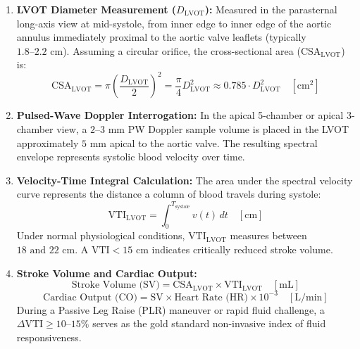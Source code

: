 \documentclass[11pt,a4paper]{article}
\begin{document}
\begin{enumerate}[leftmargin=1.5em]
    \item \textbf{LVOT Diameter Measurement ($D_{\text{LVOT}}$):} Measured in the parasternal long-axis view at mid-systole, from inner edge to inner edge of the aortic annulus immediately proximal to the aortic valve leaflets (typically $1.8\text{--}2.2\text{ cm}$). Assuming a circular orifice, the cross-sectional area ($\text{CS}\text{A}_{\text{LVOT}}$) is:
    \begin{equation}
        \text{CS}\text{A}_{\text{LVOT}} = \pi \left( \frac{D_{\text{LVOT}}}{2} \right)^2 = \frac{\pi}{4} D_{\text{LVOT}}^2 \approx 0.785 \cdot D_{\text{LVOT}}^2 \quad [\text{cm}^2]
    \end{equation}
    \item \textbf{Pulsed-Wave Doppler Interrogation:} In the apical 5-chamber or apical 3-chamber view, a $2\text{--}3\text{ mm}$ PW Doppler sample volume is placed in the LVOT approximately $5\text{ mm}$ apical to the aortic valve. The resulting spectral envelope represents systolic blood velocity over time.
    \item \textbf{Velocity-Time Integral Calculation:} The area under the spectral velocity curve represents the distance a column of blood travels during systole:
    \begin{equation}
        \text{VTI}_{\text{LVOT}} = \int_0^{T_{\text{systole}}} v(t) \, dt \quad [\text{cm}]
    \end{equation}
    Under normal physiological conditions, $\text{VTI}_{\text{LVOT}}$ measures between $18\text{ and }22\text{ cm}$. A $\text{VTI} < 15\text{ cm}$ indicates critically reduced stroke volume.
    \item \textbf{Stroke Volume and Cardiac Output:}
    \begin{equation}
        \text{Stroke Volume (SV)} = \text{CS}\text{A}_{\text{LVOT}} \times \text{VTI}_{\text{LVOT}} \quad [\text{mL}]
    \end{equation}
    \begin{equation}
        \text{Cardiac Output (CO)} = \text{SV} \times \text{Heart Rate (HR)} \times 10^{-3} \quad [\text{L/min}]
    \end{equation}
    During a Passive Leg Raise (PLR) maneuver or rapid fluid challenge, a \textbf{$\Delta\text{VTI} \ge 10\text{--}15\%$} serves as the gold standard non-invasive index of fluid responsiveness.
\end{enumerate}
\end{document}
